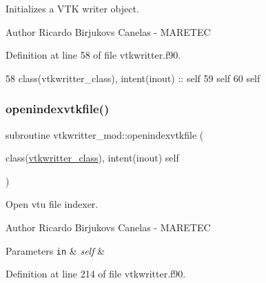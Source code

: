 Initializes a V\+TK writer object. 

\begin{DoxyAuthor}{Author}
Ricardo Birjukovs Canelas -\/ M\+A\+R\+E\+T\+EC 
\end{DoxyAuthor}


Definition at line 58 of file vtkwritter.\+f90.


\begin{DoxyCode}
58     \textcolor{keywordtype}{class}(vtkwritter\_class), \textcolor{keywordtype}{intent(inout)} :: self
59     self%
60     self%
\end{DoxyCode}
\mbox{\label{namespacevtkwritter__mod_a0c26bb22a8b7dd9f9da69309ad65d669}} 
\subsubsection{\texorpdfstring{openindexvtkfile()}{openindexvtkfile()}}
{\footnotesize\ttfamily subroutine vtkwritter\+\_\+mod\+::openindexvtkfile (\begin{DoxyParamCaption}\item[{class(\mbox{\hyperlink{structvtkwritter__mod_1_1vtkwritter__class}{vtkwritter\+\_\+class}}), intent(inout)}]{self }\end{DoxyParamCaption})\hspace{0.3cm}{\ttfamily [private]}}



Open vtu file indexer. 

\begin{DoxyAuthor}{Author}
Ricardo Birjukovs Canelas -\/ M\+A\+R\+E\+T\+EC 
\end{DoxyAuthor}

\begin{DoxyParams}[1]{Parameters}
\mbox{\tt in}  & {\em self} & \\
\hline
\end{DoxyParams}


Definition at line 214 of file vtkwritter.\+f90.


